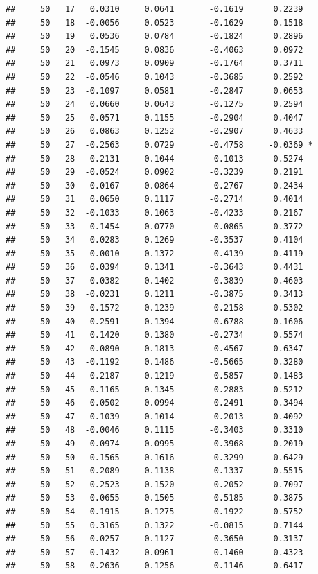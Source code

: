 \documentclass[
]{article}
\begin{document}
\begin{verbatim}
##     50   17   0.0310     0.0641       -0.1619      0.2239  
##     50   18  -0.0056     0.0523       -0.1629      0.1518  
##     50   19   0.0536     0.0784       -0.1824      0.2896  
##     50   20  -0.1545     0.0836       -0.4063      0.0972  
##     50   21   0.0973     0.0909       -0.1764      0.3711  
##     50   22  -0.0546     0.1043       -0.3685      0.2592  
##     50   23  -0.1097     0.0581       -0.2847      0.0653  
##     50   24   0.0660     0.0643       -0.1275      0.2594  
##     50   25   0.0571     0.1155       -0.2904      0.4047  
##     50   26   0.0863     0.1252       -0.2907      0.4633  
##     50   27  -0.2563     0.0729       -0.4758     -0.0369 *
##     50   28   0.2131     0.1044       -0.1013      0.5274  
##     50   29  -0.0524     0.0902       -0.3239      0.2191  
##     50   30  -0.0167     0.0864       -0.2767      0.2434  
##     50   31   0.0650     0.1117       -0.2714      0.4014  
##     50   32  -0.1033     0.1063       -0.4233      0.2167  
##     50   33   0.1454     0.0770       -0.0865      0.3772  
##     50   34   0.0283     0.1269       -0.3537      0.4104  
##     50   35  -0.0010     0.1372       -0.4139      0.4119  
##     50   36   0.0394     0.1341       -0.3643      0.4431  
##     50   37   0.0382     0.1402       -0.3839      0.4603  
##     50   38  -0.0231     0.1211       -0.3875      0.3413  
##     50   39   0.1572     0.1239       -0.2158      0.5302  
##     50   40  -0.2591     0.1394       -0.6788      0.1606  
##     50   41   0.1420     0.1380       -0.2734      0.5574  
##     50   42   0.0890     0.1813       -0.4567      0.6347  
##     50   43  -0.1192     0.1486       -0.5665      0.3280  
##     50   44  -0.2187     0.1219       -0.5857      0.1483  
##     50   45   0.1165     0.1345       -0.2883      0.5212  
##     50   46   0.0502     0.0994       -0.2491      0.3494  
##     50   47   0.1039     0.1014       -0.2013      0.4092  
##     50   48  -0.0046     0.1115       -0.3403      0.3310  
##     50   49  -0.0974     0.0995       -0.3968      0.2019  
##     50   50   0.1565     0.1616       -0.3299      0.6429  
##     50   51   0.2089     0.1138       -0.1337      0.5515  
##     50   52   0.2523     0.1520       -0.2052      0.7097  
##     50   53  -0.0655     0.1505       -0.5185      0.3875  
##     50   54   0.1915     0.1275       -0.1922      0.5752  
##     50   55   0.3165     0.1322       -0.0815      0.7144  
##     50   56  -0.0257     0.1127       -0.3650      0.3137  
##     50   57   0.1432     0.0961       -0.1460      0.4323  
##     50   58   0.2636     0.1256       -0.1146      0.6417  

\end{verbatim}
\end{document}
